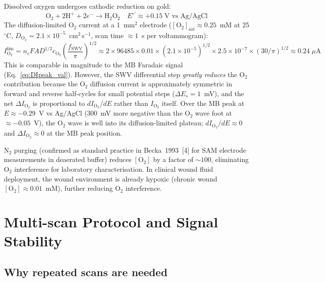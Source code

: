 \documentclass[10pt,a4paper]{article}
\numberwithin{equation}{section}
\newcommand{\cit}[1]{[#1]}
\newcommand{\Eo}{E^{\circ\prime}}
\newcommand{\DI}{\Delta I}
\newcommand{\Des}{\Delta E_s}
\begin{document}
Dissolved oxygen undergoes cathodic reduction on gold:
\begin{equation}
  \text{O}_2 + 2\text{H}^+ + 2e^- \rightarrow \text{H}_2\text{O}_2
  \quad \Eo \approx +0.15\;\text{V vs Ag/AgCl}
  \label{eq:O2redn}
\end{equation}
The diffusion-limited O$_2$ current at a 1~mm$^2$ electrode
($[\text{O}_2]_{\text{sat}} \approx 0.25$~mM at 25$^\circ$C,
$D_{\text{O}_2} = 2.1\times10^{-5}$~cm$^2$\,s$^{-1}$, scan time
$\approx 1$~s per voltammogram):
\begin{equation}
  I_{\text{O}_2}^{\text{lim}} = n_e F A D^{1/2} c_{\text{O}_2}
  \left(\frac{f_{\text{SWV}}}{\pi}\right)^{1/2}
  \approx 2 \times 96485 \times 0.01 \times (2.1\times10^{-5})^{1/2}
  \times 2.5\times10^{-7} \times (30/\pi)^{1/2}
  \approx 0.24\;\mu\text{A}
  \label{eq:IO2}
\end{equation}
This is comparable in magnitude to the MB Faradaic signal
(Eq.~\ref{eq:DIpeak_val}). However, the SWV differential step
\textit{greatly reduces} the O$_2$ contribution because the
O$_2$ diffusion current is approximately symmetric in forward and
reverse half-cycles for small potential steps ($\Des = 1$~mV),
and the net $\DI_{\text{O}_2}$ is proportional to $d I_{\text{O}_2}/dE$
rather than $I_{\text{O}_2}$ itself. Over the MB peak at
$E \approx -0.29$~V vs Ag/AgCl (300~mV more negative than the O$_2$
wave foot at $\approx -0.05$~V), the O$_2$ wave is well into its
diffusion-limited plateau; $d I_{\text{O}_2}/dE \approx 0$ and
$\DI_{\text{O}_2} \approx 0$ at the MB peak position.

N$_2$ purging (confirmed as standard practice in Becka~1993~\cit{4}
for SAM electrode measurements in deaerated buffer) reduces
$[\text{O}_2]$ by a factor of $\sim 100$, eliminating O$_2$
interference for laboratory characterisation. In clinical wound fluid
deployment, the wound environment is already hypoxic (chronic wound
$[\text{O}_2] \approx 0.01$~mM), further reducing O$_2$ interference.

\section{Multi-scan Protocol and Signal Stability}
\label{sec:multiscan}

\subsection{Why repeated scans are needed}
\end{document}

